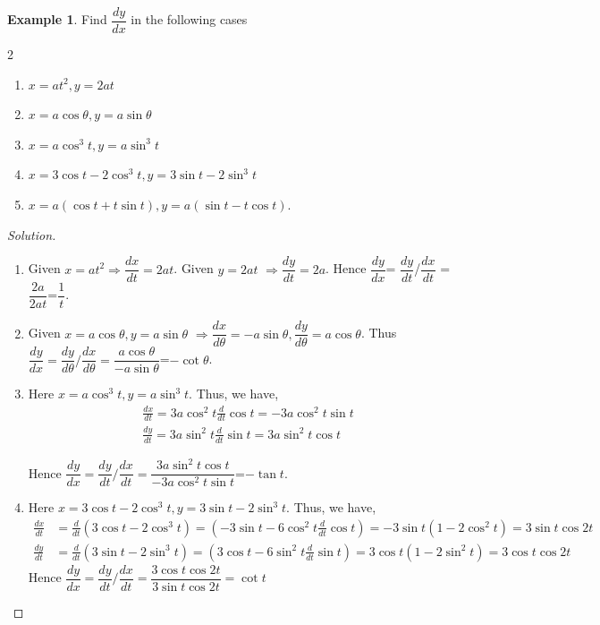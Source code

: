\documentclass[../../main.tex]{subfiles}
\theoremstyle{definition}
\newtheorem{example}{Example}[section]
\newenvironment{solution}
    {\begin{proof}[Solution]}
    {\end{proof}}
\begin{document}
\begin{example}
Find $\dfrac{dy}{dx}$ in the following cases 
\begin{multicols}{2}
\begin{enumerate}[label=(\roman*)]
    \item $x=at^2, y=2at$
    \item $x=a\cos \theta ,y= a\sin \theta $ 
    \item $x=a\cos ^3t,  y=a\sin^3 t$
    \item $x=3\cos t-2\cos^3 t,y=3\sin t-2\sin^3t$
    \item $x=a(\cos t+t\sin t), y=a(\sin t-t\cos t)$.
\end{enumerate}
\end{multicols}  
\end{example}

\begin{solution}
\begin{enumerate}[label=(\roman*)]
\item Given $x=at^2 \Rightarrow \dfrac{dx}{dt}=2at$. Given $y=2at$
$\Rightarrow \dfrac{dy}{dt}=2a$. Hence $\dfrac{dy}{dx}$= $\dfrac{dy}{dt}$/$\dfrac{dx}{dt}$ = $\dfrac{2a}{2at}$=$\dfrac{1}{t}$.

\item Given $x=a\cos \theta ,y= a\sin \theta $ $\Rightarrow \dfrac{dx}{d\theta}=-a\sin \theta , \dfrac{dy}{d\theta}=a\cos\theta $. Thus $\dfrac{dy}{dx}= \dfrac{dy}{d\theta}/\dfrac{dx}{d\theta}=\dfrac{a\cos \theta}{-a\sin\theta}$=$-\cot \theta$.

\item Here $x=a\cos ^3t,  y=a\sin^3 t$. Thus, we have,
\begin{align*}
& \frac{dx}{dt}= 3a\cos^2t \frac{d}{dt}\cos t = -3a\cos^2 t\sin t \\
& \frac{dy}{dt}=3a\sin^2 t\frac{d}{dt}\sin t=3a\sin^2 t \cos t
\end{align*}

Hence $\dfrac{dy}{dx}=\dfrac{dy}{dt}/\dfrac{dx}{dt}=\dfrac{3a\sin^2t\cos t}{-3a\cos^2t\sin t}$=$-\tan t$.

\item Here $x=3\cos t-2\cos^3 t,y=3\sin t-2\sin^3t$. Thus, we have,
\begin{align*}
\frac{dx}{dt}&=\frac{d}{dt}(3\cos t-2\cos^3 t)=(-3\sin t-6\cos ^2t\frac{d}{dt}\cos t) = -3\sin t(1-2\cos^2 t)=3\sin t\cos 2t \\ 
\frac{dy}{dt}&=\frac{d}{dt}(3\sin t-2\sin^3t)=(3\cos t-6\sin^2t\frac{d}{dt}\sin t)=3\cos t(1-2\sin^2 t)=3\cos t\cos2t
\end{align*}
Hence $\dfrac{dy}{dx}=\dfrac{dy}{dt}/\dfrac{dx}{dt}=\dfrac{3\cos t\cos2t}{3\sin t\cos 2t}=\cot t$


\end{enumerate}
\end{solution}
\end{document}

